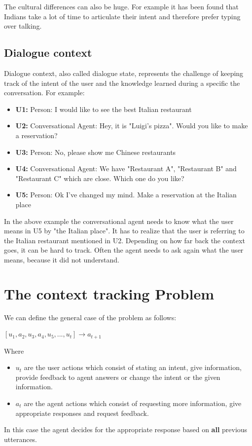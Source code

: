 \documentclass[conference]{IEEEtran}
\begin{document}
The cultural differences can also be huge. For example it has been found that Indians take a lot of time to articulate their intent and therefore prefer typing over talking\cite{chopra2017my}.


\subsection{Dialogue context}
Dialogue context, also called dialogue state, represents the challenge of keeping track of the intent of the user and the knowledge learned during a specific the conversation. For example: 

\begin{itemize}
\item[]{\textbf{U1:} Person: I would like to see the best Italian restaurant}
\item[]{\textbf{U2:} Conversational Agent:  Hey, it is "Luigi's pizza". Would you like to make a reservation?}
\item[]{\textbf{U3:} Person: No, please show me Chinese restaurants}
\item[]{\textbf{U4:} Conversational Agent: We have "Restaurant A", "Restaurant B" and "Restaurant C" which are close. Which one do you like?}
\item[]{\textbf{U5:} Person: Ok I've changed my mind. Make a reservation at the Italian place}
\end{itemize}
In the above example the conversational agent needs to know what the user means in U5 by "the Italian place". It has to realize that the user is referring to the Italian restaurant mentioned in U2. 
Depending on how far back the context goes, it can be hard to track. Often the agent needs to ask again what the user means, because it did not understand.

\section{The context tracking Problem}
We can define the general case of the problem as follows:

$[u_{1},a_{2},u_{3},a_{4},u_{5},...,u_{t}] \rightarrow a_{t+1} $

Where
\begin{itemize}
\item{ $u_{t}$ are the user actions which consist of stating an intent, give information, provide feedback to agent answers or change the intent or the given information.}
\item{$a_{t}$ are the agent actions which consist of requesting more information, give appropriate responses and request feedback.}
\end{itemize}
In this case the agent decides for the appropriate response based on \textbf{all} previous utterances.
\end{document}
